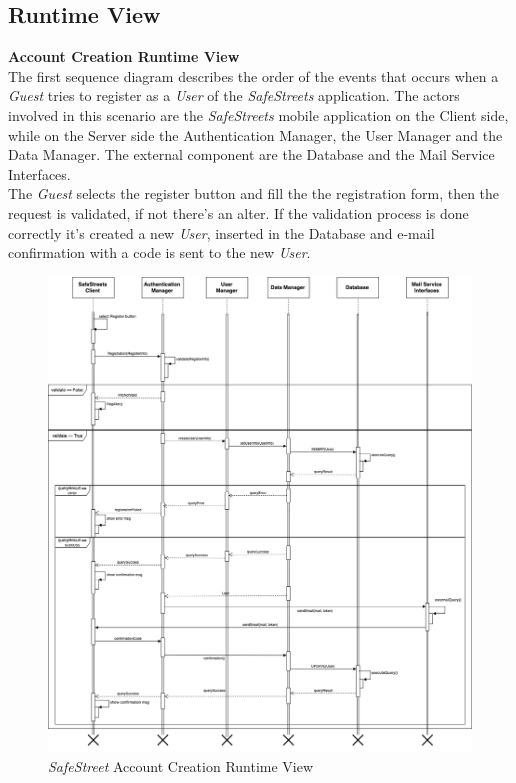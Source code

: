 \documentclass{article}
\begin{document}
	\subsection{Runtime View}
	{\bf Account Creation Runtime View} \\
	The first sequence diagram describes the order of the events that occurs when a {\it Guest} tries to register as a {\it User} of the {\it SafeStreets} application. The actors involved in this scenario are the {\it SafeStreets}  mobile application on the Client side, while on the Server side the Authentication Manager, the User Manager and the Data Manager. The external component are the Database and the Mail Service Interfaces. \\
	The {\it Guest} selects the register button and fill the the registration form, then the request is validated, if not there's an alter. If the validation process is done correctly it's created a new {\it User}, inserted in the Database and e-mail confirmation with a code is sent to the new {\it User}.
	\begin{figure}[H]
			\centering
			\includegraphics[scale=0.26]{Images/Diagrams/Runtime/registration_runtime.png}
			\caption{{\it SafeStreet} Account Creation Runtime View}
	\end{figure}	
\end{document}
